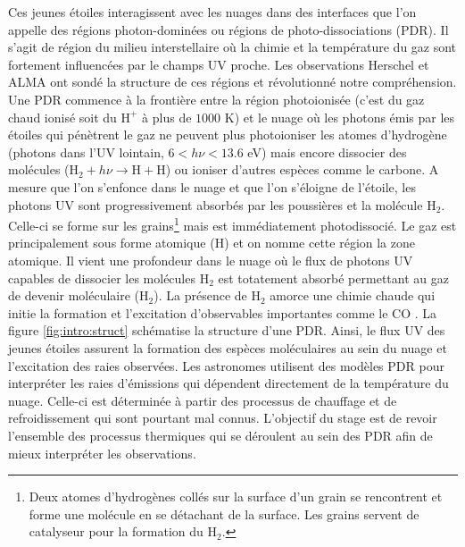 \documentclass[11pt,a4paper]{article}
\begin{document}
\begin{spacing}{0.98}
Ces jeunes étoiles interagissent avec les nuages dans des interfaces que l'on appelle des régions photon-dominées ou régions de photo-dissociations (PDR). Il s'agit de région du milieu interstellaire où la chimie et la température du gaz sont fortement influencées par le champs UV proche. Les observations Herschel et ALMA ont sondé la structure de ces régions et révolutionné notre compréhension\cite{Goicoechea2016}.
Une PDR commence à la frontière entre la région photoionisée (c'est du gaz chaud ionisé soit du $\mathrm{H}^+$ à plus de $1000$ K) et le nuage où les photons émis par les étoiles qui pénètrent le gaz ne peuvent plus photoioniser les atomes d'hydrogène (photons dans l'UV lointain, $6<h\nu<13.6$ eV) mais encore dissocier des molécules ($\mathrm{H}_2 + h\nu \rightarrow \mathrm{H}+\mathrm{H}$) ou ioniser d'autres espèces comme le carbone. A mesure que l'on s'enfonce dans le nuage et que l'on s'éloigne de l'étoile, les photons UV sont progressivement absorbés par les poussières et la molécule $\mathrm{H}_2$. Celle-ci se forme sur les grains\footnote{Deux atomes d'hydrogènes collés sur la surface d'un grain se rencontrent et forme une molécule en se détachant de la surface. Les grains servent de catalyseur pour la formation du $\mathrm{H}_2$.} mais est immédiatement photodissocié. Le gaz est principalement sous forme atomique ($\mathrm{H}$) et on nomme cette région la zone atomique. Il vient une profondeur dans le nuage où le flux de photons UV capables de dissocier les molécules $\mathrm{H}_2$ est totatement absorbé permettant au gaz de devenir moléculaire ($\mathrm{H}_2$). La présence de $\mathrm{H}_2$ amorce une chimie chaude qui initie la formation et l'excitation d'observables importantes comme le $\mathrm{CO}$ \cite{COJoblin}. La figure \ref{fig:intro:struct} schématise la structure d'une PDR. Ainsi, le flux UV des jeunes étoiles assurent la formation des espèces moléculaires au sein du nuage et l'excitation des raies observées. Les astronomes utilisent des modèles PDR pour interpréter les raies d'émissions qui dépendent directement de la température du nuage. Celle-ci est déterminée à partir des processus de chauffage et de refroidissement qui sont pourtant mal connus. L'objectif du stage est de revoir l'ensemble des processus thermiques qui se déroulent au sein des PDR afin de mieux interpréter les observations. \newline 


\end{spacing}
\end{document}
